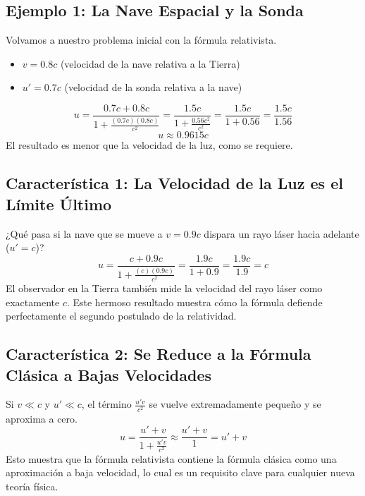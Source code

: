 \documentclass[11pt,a4paper]{article}
\begin{document}
\subsection{Ejemplo 1: La Nave Espacial y la Sonda}
Volvamos a nuestro problema inicial con la fórmula relativista.
\begin{itemize}
    \item $v = 0.8c$ (velocidad de la nave relativa a la Tierra)
    \item $u' = 0.7c$ (velocidad de la sonda relativa a la nave)
\end{itemize}
\[ u = \frac{0.7c + 0.8c}{1 + \frac{(0.7c)(0.8c)}{c^2}} = \frac{1.5c}{1 + \frac{0.56c^2}{c^2}} = \frac{1.5c}{1 + 0.56} = \frac{1.5c}{1.56} \]
\[ u \approx 0.9615c \]
El resultado es menor que la velocidad de la luz, como se requiere.

\subsection{Característica 1: La Velocidad de la Luz es el Límite Último}
¿Qué pasa si la nave que se mueve a $v=0.9c$ dispara un rayo láser hacia adelante ($u'=c$)?
\[ u = \frac{c + 0.9c}{1 + \frac{(c)(0.9c)}{c^2}} = \frac{1.9c}{1 + 0.9} = \frac{1.9c}{1.9} = c \]
El observador en la Tierra también mide la velocidad del rayo láser como exactamente $c$. Este hermoso resultado muestra cómo la fórmula defiende perfectamente el segundo postulado de la relatividad.

\subsection{Característica 2: Se Reduce a la Fórmula Clásica a Bajas Velocidades}
Si $v \ll c$ y $u' \ll c$, el término $\frac{u'v}{c^2}$ se vuelve extremadamente pequeño y se aproxima a cero.
\[ u = \frac{u' + v}{1 + \frac{u'v}{c^2}} \approx \frac{u' + v}{1} = u' + v \]
Esto muestra que la fórmula relativista contiene la fórmula clásica como una aproximación a baja velocidad, lo cual es un requisito clave para cualquier nueva teoría física.
\end{document}
